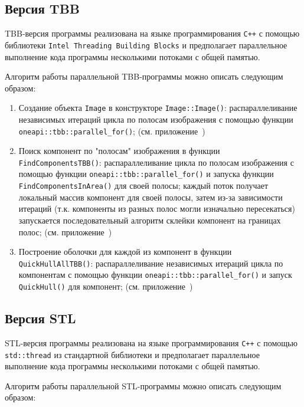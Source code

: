 \documentclass[12pt]{article}
\begin{document}
\newpage

\subsection{Версия TBB}

TBB-версия программы реализована на языке программирования \texttt{C++} с помощью библиотеки \texttt{Intel Threading Building Blocks} и предполагает параллельное выполнение кода программы несколькими потоками с общей памятью.

Алгоритм работы параллельной TBB-программы можно описать следующим образом:

\begin{enumerate}
    \item Создание объекта \texttt{Image} в конструкторе \texttt{Image::Image()}: распараллеливание независимых итераций цикла по полосам изображения с помощью функции \texttt{oneapi::tbb::parallel\_for()}; (см. приложение~)
    \item Поиск компонент по "полосам" изображения в функции \texttt{FindComponentsTBB()}: распараллеливание цикла по полосам изображения с помощью функции \texttt{oneapi::tbb::parallel\_for()} и запуска функции \texttt{FindComponentsInArea()} для своей полосы; каждый поток получает локальный массив компонент для своей полосы, затем из-за зависимости итераций (т.к. компоненты из разных полос могли изначально пересекаться) запускается последовательный алгоритм склейки компонент на границах полос; (см. приложение~)
    \item Построение оболочки для каждой из компонент в функции \texttt{QuickHullAllTBB()}: распараллеливание независимых итераций цикла по компонентам с помощью функции \texttt{oneapi::tbb::parallel\_for()} и запуск \texttt{QuickHull()} для компонент; (см. приложение~)
\end{enumerate}

\newpage

\subsection{Версия STL}

STL-версия программы реализована на языке программирования \texttt{C++} с помощью \texttt{std::thread} из стандартной библиотеки и предполагает параллельное выполнение кода программы несколькими потоками с общей памятью.

Алгоритм работы параллельной STL-программы можно описать следующим образом:
\end{document}
